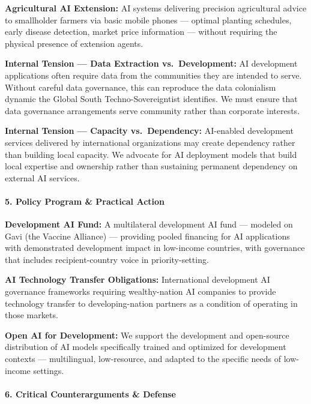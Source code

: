 \textbf{Agricultural AI Extension:} AI systems delivering precision
agricultural advice to smallholder farmers via basic mobile phones ---
optimal planting schedules, early disease detection, market price
information --- without requiring the physical presence of extension
agents.

\textbf{Internal Tension --- Data Extraction vs.~Development:} AI
development applications often require data from the communities they
are intended to serve. Without careful data governance, this can
reproduce the data colonialism dynamic the Global South
Techno-Sovereigntist identifies. We must ensure that data governance
arrangements serve community rather than corporate interests.

\textbf{Internal Tension --- Capacity vs.~Dependency:} AI-enabled
development services delivered by international organizations may create
dependency rather than building local capacity. We advocate for AI
deployment models that build local expertise and ownership rather than
sustaining permanent dependency on external AI services.

\paragraph{5. Policy Program \& Practical
Action}\label{policy-program-practical-action-46}

\textbf{Development AI Fund:} A multilateral development AI fund ---
modeled on Gavi (the Vaccine Alliance) --- providing pooled financing
for AI applications with demonstrated development impact in low-income
countries, with governance that includes recipient-country voice in
priority-setting.

\textbf{AI Technology Transfer Obligations:} International development
AI governance frameworks requiring wealthy-nation AI companies to
provide technology transfer to developing-nation partners as a condition
of operating in those markets.

\textbf{Open AI for Development:} We support the development and
open-source distribution of AI models specifically trained and optimized
for development contexts --- multilingual, low-resource, and adapted to
the specific needs of low-income settings.

\paragraph{6. Critical Counterarguments \&
Defense}\label{critical-counterarguments-defense-46}


